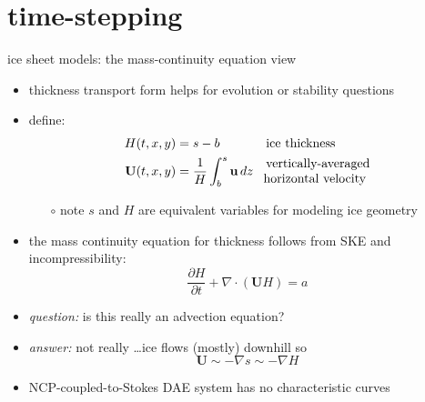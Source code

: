 \documentclass[svgnames,
               hyperref={colorlinks,citecolor=DeepPink4,linkcolor=FireBrick,urlcolor=Maroon},
               usepdftitle=false]  %
               {beamer}
\newcommand{\grad}{\nabla}
\newcommand{\bu}{\mathbf{u}}
\newcommand{\bU}{\mathbf{U}}
\begin{document}
\section{time-stepping}

\begin{frame}{ice sheet models: the mass-continuity equation view}

\begin{itemize}
\item thickness transport form helps for evolution or stability questions
\item define:
\begin{align*}
H(t,x,y) &=s-b && \text{ice thickness} \\
\bU(t,x,y) &= \frac{1}{H} \int_b^s \bu \,dz && \begin{matrix} \text{vertically-averaged} \\ \hspace{-1.8mm} \text{horizontal velocity} \end{matrix}
\end{align*}

    \begin{itemize}
    \item[$\circ$] note $s$ and $H$ are equivalent variables for modeling ice geometry
    \end{itemize}
\item the \alert{mass continuity equation} for thickness follows from SKE and incompressibility:
   $$\frac{\partial H}{\partial t} + \nabla \cdot \left(\bU H\right) = a$$

\smallskip
\item<2> \emph{question:} is this really an advection equation?
\item<2>[] \emph{answer:} not really \dots ice flows (mostly) downhill so
  $$\bU \sim - \grad s \sim - \grad H$$
\item<2> NCP-coupled-to-Stokes DAE system has no characteristic curves
\end{itemize}
\end{frame}
\end{document}
